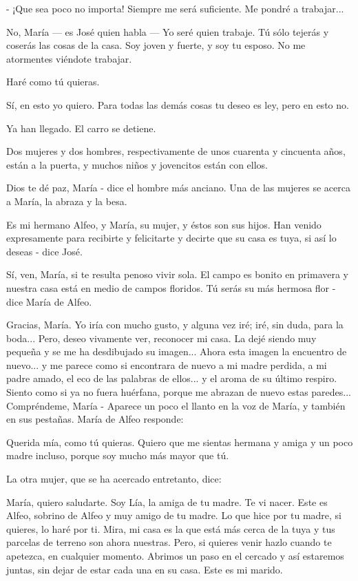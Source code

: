 \documentclass[12pt, twoside, openright]{book} %
\begin{document}
- ¡Que sea poco no importa! Siempre me será suficiente. Me pondré a trabajar... 

No, María — es José quien habla — Yo seré quien trabaje. Tú sólo tejerás y coserás las cosas de la casa. Soy joven y fuerte, y soy tu esposo. No me atormentes viéndote trabajar. 

Haré como tú quieras. 

Sí, en esto yo quiero. Para todas las demás cosas tu deseo es ley, pero en esto no. 

Ya han llegado. El carro se detiene. 

Dos mujeres y dos hombres, respectivamente de unos cuarenta y cincuenta años, están a la puerta, y muchos niños y jovencitos están con ellos. 

Dios te dé paz, María - dice el hombre más anciano. Una de las mujeres se acerca a María, la abraza y la besa. 

Es mi hermano Alfeo, y María, su mujer, y éstos son sus hijos. Han venido expresamente para recibirte y felicitarte y decirte que su casa es tuya, si así lo deseas - dice José. 

Sí, ven, María, si te resulta penoso vivir sola. El campo es bonito en primavera y nuestra casa está en medio de campos floridos. Tú serás su más hermosa flor - dice María de Alfeo. 

Gracias, María. Yo iría con mucho gusto, y alguna vez iré; iré, sin duda, para la boda... Pero, deseo vivamente ver, reconocer mi casa. La dejé siendo muy pequeña y se me ha desdibujado su imagen... Ahora esta imagen la encuentro de nuevo... y me parece como si encontrara de nuevo a mi madre perdida, a mi padre amado, el eco de las palabras de ellos... y el aroma de su último respiro. Siento como si ya no fuera huérfana, porque me abrazan de nuevo estas paredes... Compréndeme, María - Aparece un poco el llanto en la voz de María, y también en sus pestañas. María de Alfeo responde: 

Querida mía, como tú quieras. Quiero que me sientas hermana y amiga y un poco madre incluso, porque soy mucho más mayor que tú. 

La otra mujer, que se ha acercado entretanto, dice: 

María, quiero saludarte. Soy Lía, la amiga de tu madre. Te vi nacer. Este es Alfeo, sobrino de Alfeo y muy amigo de tu madre. Lo que hice por tu madre, si quieres, lo haré por ti. Mira, mi casa es la que está más cerca de la tuya y tus parcelas de terreno son ahora nuestras. Pero, si quieres venir hazlo cuando te apetezca, en cualquier momento. Abrimos un paso en el cercado y así estaremos juntas, sin dejar de estar cada una en su casa. Este es mi marido. 
\end{document}
